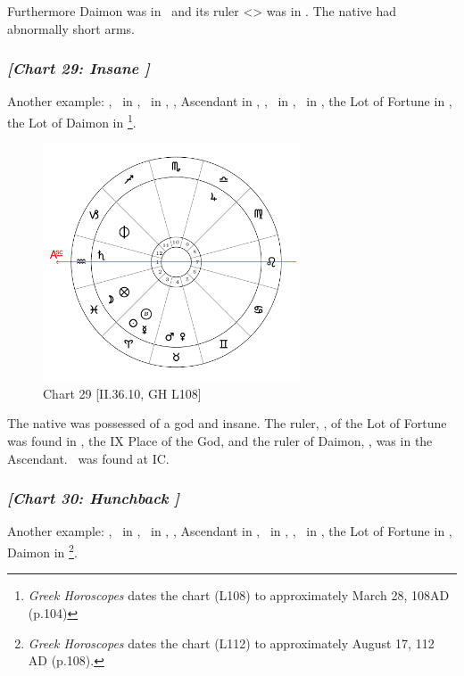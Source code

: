 Furthermore Daimon was in \Leo\, and its ruler <\Sun> was in \Taurus. The native had abnormally short arms.

\newpage
\subsubsection{\textit{[Chart 29: Insane ]}}
Another example: \Sun, \Mercury\, in \Aries, \Moon\, in \Pisces, \Saturn, Ascendant in \Aquarius, \Mars, \Venus\, in \Taurus, \Jupiter\, in \Libra, the Lot of Fortune in \Pisces, the Lot of Daimon in \Capricorn
\footnote{\textit{Greek Horoscopes} dates the chart (L108) to approximately March 28, 108AD (p.104)}.

\clearpage
\begin{figure}
\centering
\vspace{-20pt}
\includegraphics[width=0.68\textwidth]{charts/2_36_10}
\caption{Chart 29 [II.36.10, GH L108]}
\label{fig:chart29}
\end{figure}

The native was possessed of a god and insane. The ruler, \Jupiter, of the Lot of Fortune was found in \Libra, the
IX Place of the God, and the ruler of Daimon, \Saturn, was in the Ascendant. \Venus\, was found at IC.

\newpage
\subsubsection{\textit{[Chart 30: Hunchback ]}}
Another example: \Sun, \Mercury\, in \Leo, \Moon\, in \Scorpio, \Saturn, Ascendant in \Aries, \Jupiter\, in \Pisces, \Mars, \Venus\, in \Virgo, the Lot of Fortune in \Capricorn, Daimon in \Cancer
\footnote{\textit{Greek Horoscopes} dates the chart (L112) to approximately August 17, 112 AD (p.108).}.


